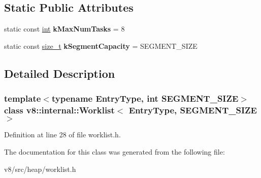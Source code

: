 \subsection*{Static Public Attributes}
\begin{DoxyCompactItemize}
\item 
\mbox{\label{classv8_1_1internal_1_1Worklist_a0d3a385648a7abf942ad435d598a4bff}} 
static const \mbox{\hyperlink{classint}{int}} {\bfseries k\+Max\+Num\+Tasks} = 8
\item 
\mbox{\label{classv8_1_1internal_1_1Worklist_a3da8321b5396a1c541f2d54a233b6ffa}} 
static const \mbox{\hyperlink{classsize__t}{size\+\_\+t}} {\bfseries k\+Segment\+Capacity} = S\+E\+G\+M\+E\+N\+T\+\_\+\+S\+I\+ZE
\end{DoxyCompactItemize}


\subsection{Detailed Description}
\subsubsection*{template$<$typename Entry\+Type, int S\+E\+G\+M\+E\+N\+T\+\_\+\+S\+I\+ZE$>$\newline
class v8\+::internal\+::\+Worklist$<$ Entry\+Type, S\+E\+G\+M\+E\+N\+T\+\_\+\+S\+I\+Z\+E $>$}



Definition at line 28 of file worklist.\+h.



The documentation for this class was generated from the following file\+:\begin{DoxyCompactItemize}
\item 
v8/src/heap/worklist.\+h\end{DoxyCompactItemize}
